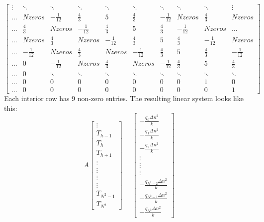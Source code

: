\documentclass[letterpaper, 12pt]{article}
\begin{document}
\begin{flushleft}
\[\begin{bmatrix}
    \vdots & \ddots & \ddots & \ddots & \ddots & \ddots & \ddots & \ddots & \ddots & \vdots \\
    \hdots & N zeros & - \frac{1}{12} & \frac{4}{3} & 5 & \frac{4}{3} & - \frac{1}{12} & N zeros & \frac{4}{3} & N zeros\\
    \hdots & \frac{4}{3} & N zeros & - \frac{1}{12} & \frac{4}{3} & 5 & \frac{4}{3} & - \frac{1}{12} & N zeros & \hdots \\
    \hdots & N zeros & \frac{4}{3} & N zeros & - \frac{1}{12} & \frac{4}{3} & 5 & \frac{4}{3} & - \frac{1}{12} & N zeros\\
    \hdots & - \frac{1}{12} & N zeros & \frac{4}{3} & N zeros & - \frac{1}{12} & \frac{4}{3} & 5 & \frac{4}{3} & - \frac{1}{12} \\
    \hdots & 0 & - \frac{1}{12} & N zeros & \frac{4}{3} & N zeros & - \frac{1}{12} & \frac{4}{3} & 5 & \frac{4}{3} \\
    \hdots & 0 & \ddots &  \ddots & \ddots & \ddots & \ddots & \ddots & \ddots & \ddots\\
    \hdots & 0 & 0 & 0 & 0 & 0 & 0 & 0 & 1 & 0 \\
    \hdots & 0 & 0 & 0 & 0 & 0 & 0 & 0 & 0 & 1
\end{bmatrix}
\]
Each interior row has 9 non-zero entries. The resulting linear system looks like this:
\[ A
\begin{bmatrix}
    \vdots \\
    T_{h-1} \\
    T_{h} \\
    T_{h+1} \\
    \vdots \\
    \vdots \\
    \vdots \\
   \vdots \\
    T_{N^2-1} \\
    T_{N^2}
\end{bmatrix}
=
\begin{bmatrix}
    - \frac{q_0 \Delta n^2}{k} \\
    - \frac{q_1 \Delta n^2}{k} \\
    - \frac{q_2 \Delta n^2}{k} \\
    \vdots \\
    \vdots \\
    \vdots \\
    - \frac{q_{N^2-2} \Delta n^2}{k} \\
    - \frac{q_{N^2-1} \Delta n^2}{k} \\
    - \frac{q_{N^2} \Delta n^2}{k}
\end{bmatrix}
\]


\end{flushleft}
\end{document}
